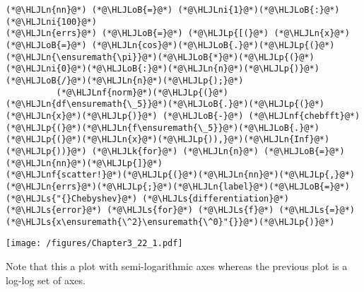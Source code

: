 \documentclass[12pt,a4paper]{article}
\newcommand{\HLJLk}[1]{\textcolor[RGB]{148,91,176}{\textbf{#1}}}
\newcommand{\HLJLn}[1]{#1}
\newcommand{\HLJLnf}[1]{\textcolor[RGB]{66,102,213}{#1}}
\newcommand{\HLJLs}[1]{\textcolor[RGB]{201,61,57}{#1}}
\newcommand{\HLJLni}[1]{\textcolor[RGB]{59,151,46}{#1}}
\newcommand{\HLJLoB}[1]{\textcolor[RGB]{102,102,102}{\textbf{#1}}}
\newcommand{\HLJLp}[1]{#1}
\begin{document}
\begin{lstlisting}
(*@\HLJLn{nn}@*) (*@\HLJLoB{=}@*) (*@\HLJLni{1}@*)(*@\HLJLoB{:}@*)(*@\HLJLni{100}@*)
(*@\HLJLn{errs}@*) (*@\HLJLoB{=}@*) (*@\HLJLp{[(}@*) (*@\HLJLn{x}@*) (*@\HLJLoB{=}@*) (*@\HLJLn{cos}@*)(*@\HLJLoB{.}@*)(*@\HLJLp{(}@*)(*@\HLJLn{\ensuremath{\pi}}@*)(*@\HLJLoB{*}@*)(*@\HLJLp{(}@*)(*@\HLJLni{0}@*)(*@\HLJLoB{:}@*)(*@\HLJLn{n}@*)(*@\HLJLp{)}@*)(*@\HLJLoB{/}@*)(*@\HLJLn{n}@*)(*@\HLJLp{);}@*)
          (*@\HLJLnf{norm}@*)(*@\HLJLp{(}@*)(*@\HLJLn{df\ensuremath{\_5}}@*)(*@\HLJLoB{.}@*)(*@\HLJLp{(}@*)(*@\HLJLn{x}@*)(*@\HLJLp{)}@*) (*@\HLJLoB{-}@*) (*@\HLJLnf{chebfft}@*)(*@\HLJLp{(}@*)(*@\HLJLn{f\ensuremath{\_5}}@*)(*@\HLJLoB{.}@*)(*@\HLJLp{(}@*)(*@\HLJLn{x}@*)(*@\HLJLp{)),}@*)(*@\HLJLn{Inf}@*)(*@\HLJLp{))}@*) (*@\HLJLk{for}@*) (*@\HLJLn{n}@*) (*@\HLJLoB{=}@*) (*@\HLJLn{nn}@*)(*@\HLJLp{]}@*)
(*@\HLJLnf{scatter!}@*)(*@\HLJLp{(}@*)(*@\HLJLn{nn}@*)(*@\HLJLp{,}@*)(*@\HLJLn{errs}@*)(*@\HLJLp{;}@*)(*@\HLJLn{label}@*)(*@\HLJLoB{=}@*)(*@\HLJLs{"{}Chebyshev}@*) (*@\HLJLs{differentiation}@*) (*@\HLJLs{error}@*) (*@\HLJLs{for}@*) (*@\HLJLs{f}@*) (*@\HLJLs{=}@*) (*@\HLJLs{x\ensuremath{\^2}\ensuremath{\^0}"{}}@*)(*@\HLJLp{)}@*)
\end{lstlisting}

\texttt{[image: /figures/Chapter3\_22\_1.pdf]}

Note that this a plot with semi-logarithmic axes whereas the previous plot is a log-log set of axes.
\end{document}
